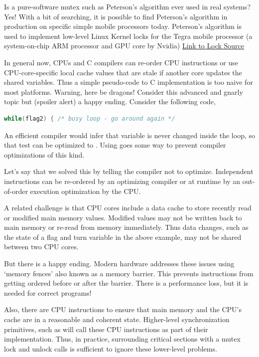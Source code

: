 Is a pure-software mutex such as Peterson's algorithm ever used in real systems?
Yes!
With a bit of searching, it is possible to find Peterson's algorithm in production on specific simple mobile processors today.
Peterson's algorithm is used to implement low-level Linux Kernel locks for the Tegra mobile processor (a system-on-chip ARM processor and GPU core by Nvidia) \href{https://android.googlesource.com/kernel/tegra.git/+/android-tegra-3.10/arch/arm/mach-tegra/sleep.S\#58}{Link to Lock Source}

In general now, CPUs and C compilers can re-order CPU instructions or use CPU-core-specific local cache values that are stale if another core updates the shared variables.
Thus a simple pseudo-code to C implementation is too naive for most platforms.
Warning, here be dragons!
Consider this advanced and gnarly topic but (spoiler alert) a happy ending.
Consider the following code,

\begin{lstlisting}[language=C]
while(flag2) { /* busy loop - go around again */
\end{lstlisting}

An efficient compiler would infer that  variable is never changed inside the loop, so that test can be optimized to . Using  goes some way to prevent compiler optimizations of this kind.

Let's say that we solved this by telling the compiler not to optimize.
Independent instructions can be re-ordered by an optimizing compiler or at runtime by an out-of-order execution optimization by the CPU.

A related challenge is that CPU cores include a data cache to store recently read or modified main memory values.
Modified values may not be written back to main memory or re-read from memory immediately.
Thus data changes, such as the state of a flag and turn variable in the above example, may not be shared between two CPU cores.

But there is a happy ending.
Modern hardware addresses these issues using `memory fences' also known as a memory barrier.
This prevents instructions from getting ordered before or after the barrier.
There is a performance loss, but it is needed for correct programs!

Also, there are CPU instructions to ensure that main memory and the CPU's cache are in a reasonable and coherent state.
Higher-level synchronization primitives, such as  will call these CPU instructions as part of their implementation.
Thus, in practice, surrounding critical sections with a mutex lock and unlock calls is sufficient to ignore these lower-level problems.

